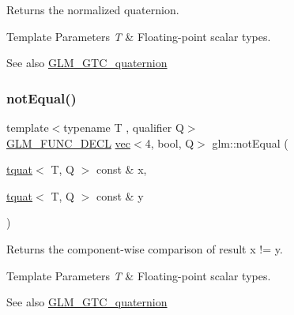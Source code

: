 Returns the normalized quaternion.


\begin{DoxyTemplParams}{Template Parameters}
{\em T} & Floating-\/point scalar types.\\
\hline
\end{DoxyTemplParams}
\begin{DoxySeeAlso}{See also}
\hyperlink{group__gtc__quaternion}{G\+L\+M\+\_\+\+G\+T\+C\+\_\+quaternion} 
\end{DoxySeeAlso}
\mbox{\label{group__gtc__quaternion_ga9494ec3489041958a240963a8a0ac9a0}} 
\subsubsection{\texorpdfstring{not\+Equal()}{notEqual()}}
{\footnotesize\ttfamily template$<$typename T , qualifier Q$>$ \\
\hyperlink{setup_8hpp_ab2d052de21a70539923e9bcbf6e83a51}{G\+L\+M\+\_\+\+F\+U\+N\+C\+\_\+\+D\+E\+CL} \hyperlink{structglm_1_1vec}{vec}$<$4, bool, Q$>$ glm\+::not\+Equal (\begin{DoxyParamCaption}\item[{\hyperlink{structglm_1_1tquat}{tquat}$<$ T, Q $>$ const \&}]{x,  }\item[{\hyperlink{structglm_1_1tquat}{tquat}$<$ T, Q $>$ const \&}]{y }\end{DoxyParamCaption})}

Returns the component-\/wise comparison of result x != y.


\begin{DoxyTemplParams}{Template Parameters}
{\em T} & Floating-\/point scalar types.\\
\hline
\end{DoxyTemplParams}
\begin{DoxySeeAlso}{See also}
\hyperlink{group__gtc__quaternion}{G\+L\+M\+\_\+\+G\+T\+C\+\_\+quaternion} 
\end{DoxySeeAlso}
\mbox{\label{group__gtc__quaternion_ga82de7204717a61a57d1bd321902bb9c6}} 
